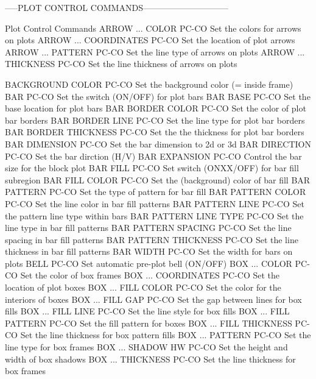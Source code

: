 -----PLOT CONTROL COMMANDS------------------------------

Plot Control Commands
ARROW ... COLOR             PC-CO Set the colors for arrows on plots
ARROW ... COORDINATES       PC-CO Set the location of plot arrows
ARROW ... PATTERN           PC-CO Set the line type of arrows on plots
ARROW ... THICKNESS         PC-CO Set the line thickness of arrows on plots

BACKGROUND COLOR            PC-CO Set the background color (= inside frame)
BAR                         PC-CO Set the switch (ON/OFF) for plot bars
BAR BASE                    PC-CO Set the base location for plot bars
BAR BORDER COLOR            PC-CO Set the color of plot bar borders
BAR BORDER LINE             PC-CO Set the line type for plot bar borders
BAR BORDER THICKNESS        PC-CO Set the the thickness for plot bar borders
BAR DIMENSION               PC-CO Set the bar dimension to 2d or 3d
BAR DIRECTION               PC-CO Set the bar dirction (H/V)
BAR EXPANSION               PC-CO Control the bar size for the block plot
BAR FILL                    PC-CO Set switch (ONXX/OFF) for bar fill subregion
BAR FILL COLOR              PC-CO Set the (background) color of bar fill
BAR PATTERN                 PC-CO Set the type of pattern for bar fill
BAR PATTERN COLOR           PC-CO Set the line color in bar fill patterns
BAR PATTERN LINE            PC-CO Set the pattern line type within bars
BAR PATTERN LINE TYPE       PC-CO Set the line type in bar fill patterns
BAR PATTERN SPACING         PC-CO Set the line spacing in bar fill patterns
BAR PATTERN THICKNESS       PC-CO Set the line thickness in bar fill patterns
BAR WIDTH                   PC-CO Set the width for bars on plots
BELL                        PC-CO Set automatic pre-plot bell (ON/OFF)
BOX ... COLOR               PC-CO Set the color of box frames
BOX ... COORDINATES         PC-CO Set the location of plot boxes
BOX ... FILL COLOR          PC-CO Set the color for the interiors of boxes
BOX ... FILL GAP            PC-CO Set the gap between lines for box fills
BOX ... FILL LINE           PC-CO Set the line style for box fills
BOX ... FILL PATTERN        PC-CO Set the fill pattern for boxes
BOX ... FILL THICKNESS      PC-CO Set the line thickness for box pattern fills
BOX ... PATTERN             PC-CO Set the line type for box frames
BOX ... SHADOW HW           PC-CO Set the height and width of box shadows
BOX ... THICKNESS           PC-CO Set the line thickness for box frames

